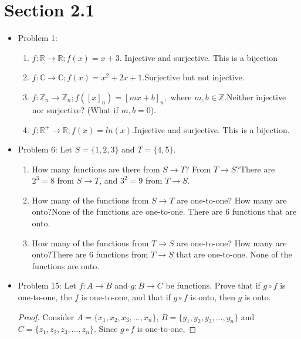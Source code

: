\documentclass[hidelinks,12pt]{article}
\title{\scalebox{2}{Math 531 Homework 3}}
\author{\scalebox{1.5}{Theo Koss}}
\date{February 2021}
\newcommand{\C}{\mathbb{C}}
\newcommand{\R}{\mathbb{R}}
\newcommand{\Z}{\mathbb{Z}}
\begin{document}
\graphicspath{{/home/theo/Documents/GitHub/Math-Homeworks/Math 531/Random/}}
\maketitle
\section{Section 2.1}
\begin{itemize}
    \item Problem 1:\begin{enumerate}[label=(\alph*)]
        \item $f:\R\to\R;f(x)=x+3$.
        \newline Injective and surjective. This is a bijection
        \item $f:\C\to\C;f(x)=x^2+2x+1$.\newline Surjective but not injective.
        \item $f:\Z_n\to\Z_n;f([x]_n)=[mx+b]_n,$ where $m,b\in\Z$.\newline Neither injective nor surjective? (What if $m,b=0$).
        \item $f:\R^+\to\R;f(x)=ln(x)$.\newline Injective and surjective. This is a bijection.
    \end{enumerate}
    \item Problem 6: Let $S=\{1,2,3\}$ and $T=\{4,5\}$.\begin{enumerate}[label=(\alph*)]
    \item How many functions are there from $S\to T$? From $T\to S$?\newline There are $2^3=8$ from $S\to T$, and $3^2=9$ from $T\to S$.
    \item How many of the functions from $S\to T$ are one-to-one? How many are onto?\newline None of the functions are one-to-one. There are 6 functions that are onto.
    \item How many of the functions from $T\to S$ are one-to-one? How many are onto?\newline There are 6 functions from $T\to S$ that are one-to-one. None of the functions are onto.
    \end{enumerate}
    \item Problem 15: Let $f:A\to B$ and $g:B\to C$ be functions. Prove that if $g\circ f$ is one-to-one, the $f$ is one-to-one, and that if $g\circ f$ is onto, then $g$ is onto. \begin{proof}
    Consider $A=\{x_1,x_2,x_3,...,x_n\}$, $B=\{y_1,y_2,y_3,...,y_n\}$ and $C=\{z_1,z_2,z_3,...,z_n\}$. Since $g\circ f$ is one-to-one, 
    \end{proof}
\end{itemize}
\end{document}
